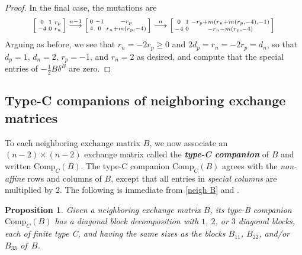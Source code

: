\documentclass{amsart}
\newtheorem{proposition}{Proposition}[section]
\theoremstyle{definition}
\theoremstyle{remark}
\numberwithin{equation}{section}
\newcommand{\newword}[1]{\textbf{\emph{#1}}}
\newcommand{\0}{{\mathbf{0}}}
\newcommand{\Comp}{\mathrm{Comp}_C}
\begin{document}
\begin{proof}
In the final case, the mutations are
\[\begin{bsmallmatrix*}
0 & 1 & r_p\\
-4 & 0 &r_n
\end{bsmallmatrix*}\overset{n-1}{\longrightarrow} 
\begin{bsmallmatrix*}
0 & -1 & -r_p\\
4 & 0 &r_n+m(r_p,-4)
\end{bsmallmatrix*}\overset{n}{\longrightarrow} 
\begin{bsmallmatrix*}
0 & 1 &-r_p+m(r_n+m(r_p,-4),-1)\\
-4 & 0 &-r_n-m(r_p,-4)
\end{bsmallmatrix*}
\]
Arguing as before, we see that $r_n=-2r_p\ge0$ and $2d_p=r_n=-2r_p=d_n$, so that $d_p=1$, $d_n=2$, $r_p=-1$, and $r_n=2$ as desired, and compute that the special entries of $-\frac12B\delta^B$ are zero.
\end{proof}

\subsection{Type-C companions of neighboring exchange matrices}
To each neighboring exchange matrix $B$, we now associate an $(n-2)\times(n-2)$ exchange matrix called the \newword{type-C companion} of $B$ and written $\Comp(B)$.
The type-C companion $\Comp(B)$ agrees with the \emph{non-affine} rows and columns of $B$, except that all entries in \emph{special columns} are multiplied by $2$.
The following  is immediate from \cref{neigh B} and \cite[Proposition~3.3]{NakanishiStella}.

\begin{proposition}\label{Comp is C}
Given a neighboring exchange matrix $B$, its type-B companion $\Comp(B)$ has a diagonal block decomposition with $1$, $2$, or $3$ diagonal blocks, each of finite type C, and having the same sizes as the blocks $B_{11}$, $B_{22}$, and/or $B_{33}$ of~$B$.
\end{proposition}
%
\end{document}
